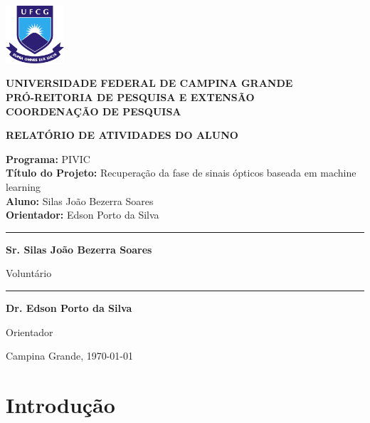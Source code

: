 \documentclass[12pt,openright,openany,oneside,article,a4paper,brazi]{abntex2}
\newcommand\signature[2]{%
\begin{center}\begin{minipage}{10cm}
    \centering
    \vspace{14pt}\par
    \rule{10cm}{1pt}\par
   \large \textbf{#1}\par
    #2%
\end{minipage}
\end{center}
}
\newcommand\insertdate[1][\today]{
\vfill
\begin{center}
\large #1, \today
\end{center}
}
\begin{document}

\begin{center}

\includegraphics[width=2.17cm,height=2.14cm]{ufcg.png}


{\textbf {UNIVERSIDADE FEDERAL DE CAMPINA GRANDE\\
PRÓ-REITORIA DE PESQUISA E EXTENSÃO\\
COORDENAÇÃO DE PESQUISA}}
\end{center}

 
\vspace{24pt}
\begin{mybox}
\begin{center}
{\Large \textbf{RELATÓRIO DE ATIVIDADES DO ALUNO}}
\end{center}
\end{mybox}
\vspace{12pt}


\begin{flushleft}
{\large \textbf{Programa:} PIVIC}\\
\vspace{14pt}
{\large \textbf{Título do Projeto:} Recuperação da fase de sinais ópticos baseada em machine learning}\\
\vspace{14pt}
{\large \textbf{Aluno:} Silas João Bezerra Soares}\\
\vspace{14pt}
{\large \textbf{Orientador:} Edson Porto da Silva}
\end{flushleft}
\vspace{140pt}


\signature{Sr. Silas João Bezerra Soares}{Voluntário}
\signature{Dr. Edson Porto da Silva}{Orientador}

\vspace{5pt}
\insertdate[Campina Grande]


\newpage


\section*{Introdução}
\end{document}
